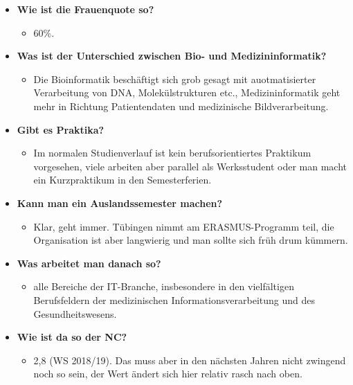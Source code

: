 \begin{large}
\begin{itemize}
	\item \textbf{Wie ist die Frauenquote so?}
	\begin{itemize}
		\item 60\%.
	\end{itemize}
\end{itemize}

\begin{itemize}
	\item \textbf{Was ist der Unterschied zwischen Bio- und Medizininformatik?}
	\begin{itemize}
		\item Die Bioinformatik beschäftigt sich grob gesagt mit auotmatisierter Verarbeitung von DNA, Molekülstrukturen etc., Medizininformatik geht mehr in Richtung Patientendaten und medizinische Bildverarbeitung.
	\end{itemize}
\end{itemize}

\begin{itemize}
	\item \textbf{Gibt es Praktika?}
	\begin{itemize}
		\item Im normalen Studienverlauf ist kein berufsorientiertes Praktikum vorgesehen, viele arbeiten aber parallel als Werksstudent oder man macht ein Kurzpraktikum in den Semesterferien.
	\end{itemize}
\end{itemize}

\begin{itemize}
	\item \textbf{Kann man ein Auslandssemester machen?}
	\begin{itemize}
		\item Klar, geht immer. Tübingen nimmt am ERASMUS-Programm teil, die Organisation ist aber langwierig und man sollte sich früh drum kümmern.
	\end{itemize}
\end{itemize}

\begin{itemize}
	\item \textbf{Was arbeitet man danach so?}
	\begin{itemize}
		\item alle Bereiche der IT-Branche, insbesondere in den vielfältigen Berufsfeldern der medizinischen Informationsverarbeitung und des Gesundheitswesens.
	\end{itemize}
\end{itemize}

\begin{itemize}
	\item \textbf{Wie ist da so der NC?}
	\begin{itemize}
		\item 2,8 (WS 2018/19). Das muss aber in den nächsten Jahren nicht zwingend noch so sein, der Wert ändert sich hier relativ rasch nach oben.
	\end{itemize}
\end{itemize}


\end{large}